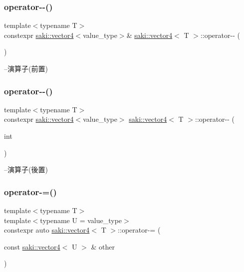 \subsubsection{\texorpdfstring{operator-\/-\/()}{operator--()}\hspace{0.1cm}{\footnotesize\ttfamily [1/2]}}
{\footnotesize\ttfamily template$<$typename T$>$ \\
constexpr \mbox{\hyperlink{classsaki_1_1vector4}{saki\+::vector4}}$<$value\+\_\+type$>$\& \mbox{\hyperlink{classsaki_1_1vector4}{saki\+::vector4}}$<$ T $>$\+::operator-\/-\/ (\begin{DoxyParamCaption}{ }\end{DoxyParamCaption})\hspace{0.3cm}{\ttfamily [inline]}}



--演算子(前置) 

\mbox{\label{classsaki_1_1vector4_af0937fd1074b0ab42f0c95ba1229817b}} 
\subsubsection{\texorpdfstring{operator-\/-\/()}{operator--()}\hspace{0.1cm}{\footnotesize\ttfamily [2/2]}}
{\footnotesize\ttfamily template$<$typename T$>$ \\
constexpr \mbox{\hyperlink{classsaki_1_1vector4}{saki\+::vector4}}$<$value\+\_\+type$>$ \mbox{\hyperlink{classsaki_1_1vector4}{saki\+::vector4}}$<$ T $>$\+::operator-\/-\/ (\begin{DoxyParamCaption}\item[{int}]{ }\end{DoxyParamCaption})\hspace{0.3cm}{\ttfamily [inline]}}



--演算子(後置) 

\mbox{\label{classsaki_1_1vector4_ab7b3e11c18b1a5bb5f3d8a029c6d8ccf}} 
\subsubsection{\texorpdfstring{operator-\/=()}{operator-=()}}
{\footnotesize\ttfamily template$<$typename T$>$ \\
template$<$typename U  = value\+\_\+type$>$ \\
constexpr auto \mbox{\hyperlink{classsaki_1_1vector4}{saki\+::vector4}}$<$ T $>$\+::operator-\/= (\begin{DoxyParamCaption}\item[{const \mbox{\hyperlink{classsaki_1_1vector4}{saki\+::vector4}}$<$ U $>$ \&}]{other }\end{DoxyParamCaption})\hspace{0.3cm}{\ttfamily [inline]}}



